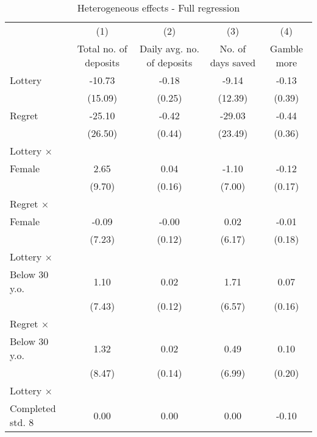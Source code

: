 \begin{table}[htbp]\centering
\def\sym#1{\ifmmode^{#1}\else\(^{#1}\)\fi}
\caption{Heterogeneous effects - Full regression}
\begin{tabular}{l*{4}{c}}
\toprule
                &\multicolumn{1}{c}{(1)}&\multicolumn{1}{c}{(2)}&\multicolumn{1}{c}{(3)}&\multicolumn{1}{c}{(4)}\\
                &\multicolumn{1}{c}{Total no. of deposits}&\multicolumn{1}{c}{Daily avg. no. of deposits}&\multicolumn{1}{c}{No. of days saved}&\multicolumn{1}{c}{Gamble more}\\
\midrule
Lottery         &   -10.73         &    -0.18         &    -9.14         &    -0.13         \\
                &  (15.09)         &   (0.25)         &  (12.39)         &   (0.39)         \\
\addlinespace
Regret          &   -25.10         &    -0.42         &   -29.03         &    -0.44         \\
                &  (26.50)         &   (0.44)         &  (23.49)         &   (0.36)         \\
\addlinespace
Lottery $\times$ \\ Female&     2.65         &     0.04         &    -1.10         &    -0.12         \\
                &   (9.70)         &   (0.16)         &   (7.00)         &   (0.17)         \\
\addlinespace
Regret $\times$ \\ Female&    -0.09         &    -0.00         &     0.02         &    -0.01         \\
                &   (7.23)         &   (0.12)         &   (6.17)         &   (0.18)         \\
\addlinespace
Lottery $\times$ \\ Below 30 y.o.&     1.10         &     0.02         &     1.71         &     0.07         \\
                &   (7.43)         &   (0.12)         &   (6.57)         &   (0.16)         \\
\addlinespace
Regret $\times$ \\ Below 30 y.o.&     1.32         &     0.02         &     0.49         &     0.10         \\
                &   (8.47)         &   (0.14)         &   (6.99)         &   (0.20)         \\
\addlinespace
Lottery $\times$ \\ Completed std. 8&     0.00         &     0.00         &     0.00         &    -0.10         \\

\end{tabular}
\end{table}
